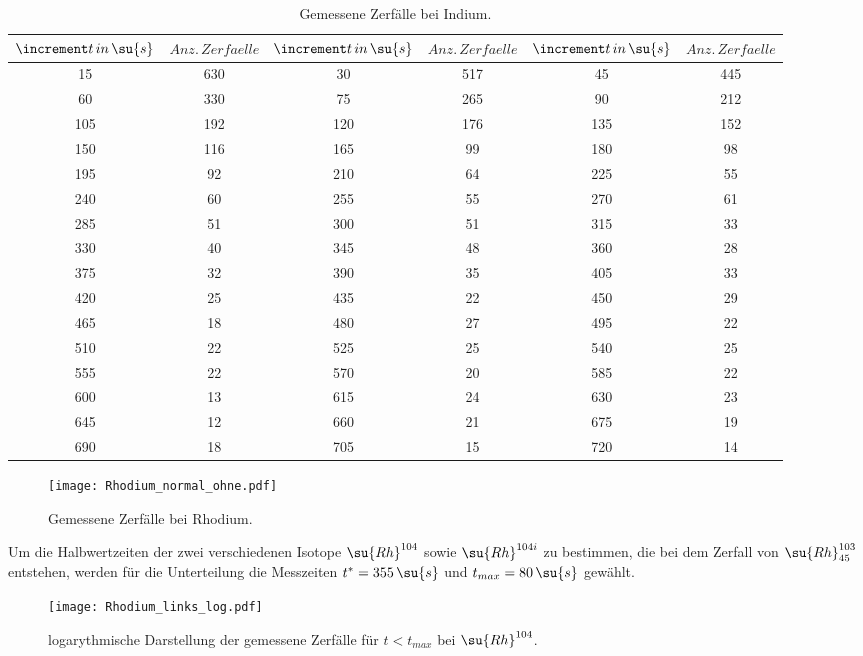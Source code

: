\begin{table}
  \centering
  \caption{Gemessene Zerfälle bei Indium.}
  \label{tab:Indium}
  \begin{tabular}{c c c c c c}
    \toprule $\increment t \, in \, \su{s}$ & $Anz. \, Zerfaelle$ & $\increment t \, in \, \su{s}$ & $Anz. \, Zerfaelle$
           & $\increment t \, in \, \su{s}$ & $Anz. \, Zerfaelle$ \\
    \midrule
    15 & 630 & 30 & 517 & 45 & 445 \\
    60 & 330 & 75 & 265 & 90 & 212 \\
    105 & 192 & 120 & 176 & 135 & 152 \\
    150 & 116 & 165 & 99 & 180 & 98 \\
    195 & 92 & 210 & 64 & 225 & 55 \\
    240 & 60 & 255 & 55 & 270 & 61 \\
    285 & 51 & 300 & 51 & 315 & 33 \\
    330 & 40 & 345 & 48 & 360 & 28 \\
    375 & 32 & 390 & 35 & 405 & 33 \\
    420 & 25 & 435 & 22 & 450 & 29 \\
    465 & 18 & 480 & 27 & 495 & 22 \\
    510 & 22 & 525 & 25 & 540 & 25 \\
    555 & 22 & 570 & 20 & 585 & 22 \\
    600 & 13 & 615 & 24 & 630 & 23 \\
    645 & 12 & 660 & 21 & 675 & 19 \\
    690 & 18 & 705 & 15 & 720 & 14 \\
    \bottomrule
  \end{tabular}
\end{table}

\begin{figure}
  \texttt{[image: Rhodium\_normal\_ohne.pdf]}
  \caption{Gemessene Zerfälle bei Rhodium.}
  \label{fig:RhodiumOhne}
\end{figure}

Um die Halbwertzeiten der zwei verschiedenen Isotope $\su{Rh}^{104}$ sowie $\su{Rh}^{104i}$
zu bestimmen, die bei dem Zerfall von $\su{Rh}_{45}^{103}$ entstehen, werden für die
Unterteilung die Messzeiten $t^{*}=355 \, \su{s}$ und $t_{max}=80 \, \su{s}$ gewählt.

\begin{figure}
  \texttt{[image: Rhodium\_links\_log.pdf]}
  \caption{logarythmische Darstellung der gemessene Zerfälle für $t < t_{max}$ bei $\su{Rh}^{104}$.}
  \label{fig:Rh104}
\end{figure}


